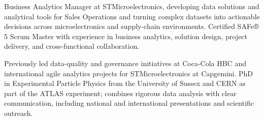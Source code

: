 
Business Analytics Manager at STMicroelectronics, developing data solutions and analytical tools for Sales Operations and turning complex datasets into actionable decisions across microelectronics and supply-chain environments. Certified SAFe® 5 Scrum Master with experience in business analytics, solution design, project delivery, and cross-functional collaboration.

Previously led data-quality and governance initiatives at Coca-Cola HBC and international agile analytics projects for STMicroelectronics at Capgemini. PhD in Experimental Particle Physics from the University of Sussex and CERN as part of the ATLAS experiment; combines rigorous data analysis with clear communication, including national and international presentations and scientific outreach.
